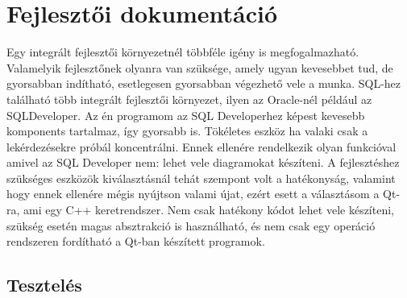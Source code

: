 
\chapter{Fejlesztői dokumentáció}

Egy integrált fejlesztői környezetnél többféle igény is megfogalmazható. Valamelyik fejlesztőnek
olyanra van szüksége, amely ugyan kevesebbet tud, de gyorsabban indítható, esetlegesen gyorsabban
végezhető vele a munka. SQL-hez található több integrált fejlesztői környezet, ilyen az Oracle-nél
például az SQLDeveloper.
Az én programom az SQL Developerhez képest kevesebb komponents tartalmaz, így gyorsabb is. Tökéletes
eszköz ha valaki csak a lekérdezésekre próbál koncentrálni. Ennek ellenére rendelkezik olyan
funkcióval amivel az SQL Developer nem: lehet vele diagramokat készíteni.
A fejlesztéshez szükséges eszközök kiválasztásnál tehát szempont volt a hatékonyság, valamint hogy
ennek ellenére mégis nyújtson valami újat, ezért esett a választásom a Qt-ra, ami egy C++ keretrendszer.
Nem csak hatékony kódot lehet vele készíteni, szükség esetén magas absztrakció is használható, és nem
csak egy operáció rendszeren fordítható a Qt-ban készített programok.

\section{Tesztelés}